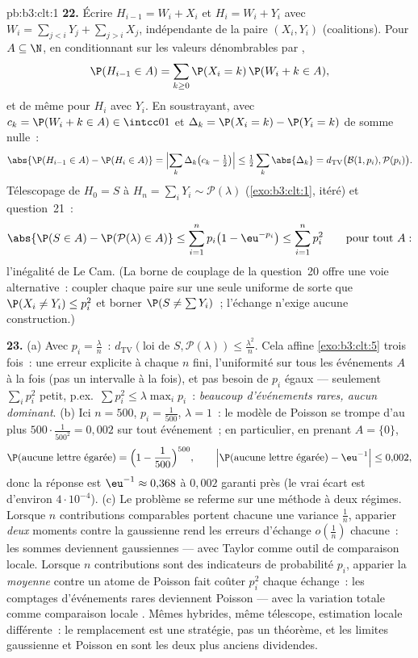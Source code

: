 \begin{solution}{pb:b3:clt:1}
\textbf{22.} Écrire $H_{i-1} = W_i + X_i$ et $H_i = W_i +
Y_i$ avec $W_i = \sum_{j<i}Y_j + \sum_{j>i}X_j$,
indépendante de la paire $(X_i, Y_i)$ (coalitions). Pour $A
\subseteq \N$, en conditionnant sur les valeurs dénombrables
par ,
\[
\P(H_{i-1} \in A) = \sum_{k\geq0}\P(X_i = k)\,\P(W_i + k
\in A),
\]
et de même pour $H_i$ avec $Y_i$. En soustrayant, avec $c_k
= \P(W_i + k \in A) \in \intcc01$ et $\Delta_k = \P(X_i =
k) - \P(Y_i = k)$ de somme nulle~:
\[
\abs{\P(H_{i-1} \in A) - \P(H_i \in A)} =
\Bigl|\sum_k\Delta_k\bigl(c_k - \tfrac12\bigr)\Bigr| \leq
\tfrac12\sum_k\abs{\Delta_k} =
d_{\mathrm{TV}}\bigl(\mathcal B(1, p_i), \mathcal
P(p_i)\bigr) .
\]
Télescopage de $H_0 = S$ à $H_n = \sum_iY_i \sim \mathcal
P(\lambda)$ (\cref{exo:b3:clt:1}, itéré) et question~21~:
\[
\abs{\P(S \in A) - \P(\mathcal P(\lambda) \in A)} \leq
\sum_{i=1}^np_i\bigl(1 - \eu^{-p_i}\bigr) \leq
\sum_{i=1}^np_i^2
\qquad\text{pour tout } A :
\]
l'inégalité de Le Cam. (La borne de couplage de la
question~20 offre une voie alternative~: coupler chaque paire
sur une seule uniforme de sorte que $\P(X_i \neq Y_i) \leq
p_i^2$ et borner $\P(S \neq \sum Y_i)$~; l'échange n'exige
aucune construction.)

\textbf{23.} (a) Avec $p_i = \frac\lambda n$~:
$d_{\mathrm{TV}}(\text{loi de }S, \mathcal P(\lambda))
\leq \frac{\lambda^2}n$. Cela affine
\cref{exo:b3:clt:5} trois fois~: une erreur explicite à
chaque $n$ fini, l'uniformité sur tous les événements $A$ à
la fois (pas un intervalle à la fois), et pas besoin de
$p_i$ égaux --- seulement $\sum_ip_i^2$ petit, p.ex.\ $\sum
p_i^2 \leq \lambda\max_ip_i$~: \emph{beaucoup d'événements
rares, aucun dominant}. (b) Ici $n = 500$, $p_i =
\frac1{500}$, $\lambda = 1$~: le modèle de Poisson se trompe
d'au plus $500\cdot\frac1{500^2} = 0{,}002$ sur tout
événement~; en particulier, en prenant $A = \{0\}$,
\[
\P(\text{aucune lettre égarée}) = \Bigl(1 -
\frac1{500}\Bigr)^{500},
\qquad
\Bigl|\P(\text{aucune lettre égarée}) - \eu^{-1}\Bigr| \leq
0{,}002,
\]
donc la réponse est $\eu^{-1} \approx 0{,}368$ à $0{,}002$
garanti près (le vrai écart est d'environ $4\cdot10^{-4}$).
(c) Le problème se referme sur une méthode à deux régimes.
Lorsque $n$ contributions comparables portent chacune une
variance $\frac1n$, apparier \emph{deux} moments contre la
gaussienne rend les erreurs d'échange $o(\frac1n)$
chacune~: les sommes deviennent gaussiennes --- avec Taylor
comme outil de comparaison locale. Lorsque $n$ contributions
sont des indicateurs de probabilité $p_i$, apparier la
\emph{moyenne} contre un atome de Poisson fait coûter
$p_i^2$ chaque échange~: les comptages d'événements rares
deviennent Poisson --- avec la variation totale comme
comparaison locale . Mêmes hybrides, même télescope,
estimation locale différente~: le remplacement est une
stratégie, pas un théorème, et les limites gaussienne et
Poisson en sont les deux plus anciens dividendes.


\end{solution}
